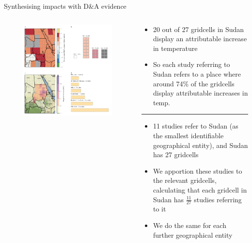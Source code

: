 \documentclass[9pt]{beamer}
\begin{document}
\begin{frame}{Synthesising impacts with D\&A evidence}

\small

\begin{columns}
	\begin{column}{0.6\linewidth}
		\begin{figure}
			\includegraphics[width=\linewidth]{../figures/si_figure_9.pdf}
		\end{figure}
	\end{column}
	\begin{column}{0.4\linewidth}
		\begin{itemize}
			\item 20 out of 27 gridcells in Sudan display an attributable increase in temperature
			\item So each study referring to Sudan refers to a place where around 74\% of the gridcells display attributable increases in temp.
		\end{itemize}
				\rule{\linewidth}{0.2pt}
		\begin{itemize}
			\item 11 studies refer to Sudan (as the smallest identifiable geographical entity), and Sudan has 27 gridcells
			\item We apportion these studies to the relevant gridcells, calculating that each gridcell in Sudan has $\frac{11}{27}$ studies referring to it
			\item We do the same for each further geographical entity
		\end{itemize}
		
	\end{column}
\end{columns}

\end{frame}
\end{document}
